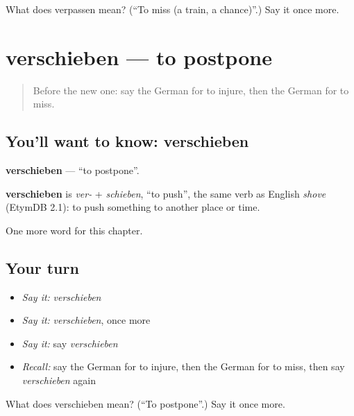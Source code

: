\begin{tcolorbox}[breakable,colback=teal!4,colframe=teal!35!black,title={Before you move on}]
What does verpassen mean? (\textquotedblleft{}To miss (a train, a chance)\textquotedblright{}.) Say it once more.
\end{tcolorbox}
\section[verschieben]{verschieben — to postpone}

\label{lesson:GE-C190-verschieben}



\begin{quote}
Before the new one: say the German for to injure, then the German for to miss.
\end{quote}

\subsection*{You'll want to know: verschieben}
\textbf{verschieben} — \textquotedblleft{}to postpone\textquotedblright{}.

\begin{cousinweb}
\textbf{verschieben} is \emph{ver-} + \emph{schieben}, \textquotedblleft{}to push\textquotedblright{}, the same verb as English \emph{shove} (EtymDB 2.1): to push something to another place or time.
\end{cousinweb}

\begin{grammarlens}[title={What you've built}]
One more word for this chapter.
\end{grammarlens}

\subsection*{Your turn}
\begin{itemize}
\raggedright
  \item \emph{Say it:} \emph{verschieben}
  \item \emph{Say it:} \emph{verschieben}, once more
  \item \emph{Say it:} say \emph{verschieben}
  \item \emph{Recall:} say the German for to injure, then the German for to miss, then say \emph{verschieben} again
\end{itemize}

\begin{tcolorbox}[breakable,colback=teal!4,colframe=teal!35!black,title={Before you move on}]
What does verschieben mean? (\textquotedblleft{}To postpone\textquotedblright{}.) Say it once more.
\end{tcolorbox}
